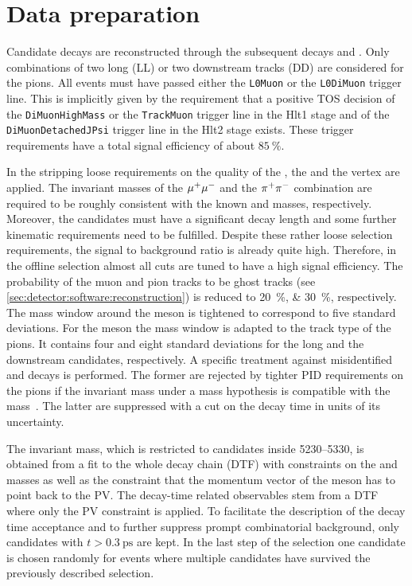 
\section{Data preparation}
\label{sec:bd2jpsiks:datapreparation}


Candidate \BdToJPsiKS decays are reconstructed through the subsequent decays
\mbox{\JPsiToMuMu} and \KSToPiPi. Only combinations of two long (LL) or two
downstream tracks (DD) are considered for the pions. All events must have passed
either the \texttt{L0Muon} or the \texttt{L0DiMuon} trigger line. This is
implicitly given by the requirement that a positive \jpsi TOS
decision of the \texttt{DiMuonHighMass} or the \texttt{TrackMuon} trigger line
in the Hlt1 stage and of the \texttt{DiMuonDetachedJPsi} trigger line in the
Hlt2 stage exists. These trigger requirements have a total signal efficiency
of about $\SI{85}{\percent}$.

In the stripping loose requirements on the quality of the \jpsi, the \KS and
the \Bd vertex are applied. The invariant masses of the ${\mu^+\mu^-}$ and the
${{\pi}^+}{{\pi}^-}$ combination are required to be roughly consistent with the known
\jpsi and \KS masses, respectively. Moreover, the \KS candidates must have a
significant decay length and some further kinematic requirements need to be
fulfilled. Despite these rather loose selection requirements, the signal to
background ratio is already quite high. Therefore, in the offline selection
almost all cuts are tuned to have a high signal efficiency. The probability of
the muon and pion tracks to be ghost tracks (see
\cref{sec:detector:software:reconstruction}) is reduced to
\SIlist{20;30}{\percent}, respectively. The mass window around the \jpsi meson
is tightened to correspond to five standard deviations. For the \KS meson the
mass window is adapted to the track type of the pions. It contains four and
eight standard deviations for the long and the downstream candidates,
respectively. A specific treatment against misidentified \LbToJPsiL and
\BdToJPsiKstar decays is performed. The former are rejected by tighter PID
requirements on the pions if the invariant mass under a \pion\proton mass
hypothesis is compatible with the \Lz mass~\cite{PDG2014}. The latter
are suppressed with a cut on the \KS decay time in units of its uncertainty.

The invariant \Bd mass, which is restricted to candidates inside
\SIrange{5230}{5330}{\MeVcc}, is obtained from a fit to the whole decay chain
(DTF) with constraints on the \jpsi and \KS masses as well as the constraint
that the momentum vector of the \Bd meson has to point back to the PV. The
decay-time related observables stem from a DTF where only the PV constraint is
applied. To facilitate the description of the decay time acceptance and to
further suppress prompt combinatorial background, only candidates with $t >
\SI{0.3}{\ps}$ are kept. In the last step of the selection one candidate is
chosen randomly for events where multiple candidates have survived the
previously described selection.
